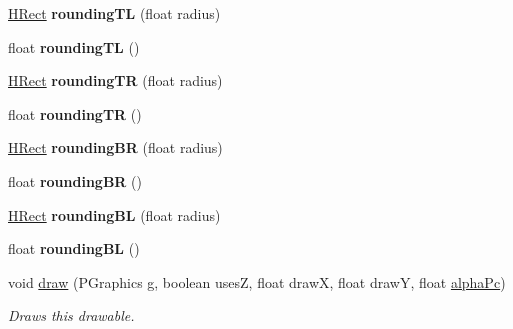 \begin{DoxyCompactItemize}
\item 
\hypertarget{classhype_1_1extended_1_1drawable_1_1_h_rect_a3dbebef6e54ba3c87be895d9e47fd8c4}{\hyperlink{classhype_1_1extended_1_1drawable_1_1_h_rect}{H\-Rect} {\bfseries rounding\-T\-L} (float radius)}\label{classhype_1_1extended_1_1drawable_1_1_h_rect_a3dbebef6e54ba3c87be895d9e47fd8c4}

\item 
\hypertarget{classhype_1_1extended_1_1drawable_1_1_h_rect_ac949ee8c38d5f35d3f440ea000406632}{float {\bfseries rounding\-T\-L} ()}\label{classhype_1_1extended_1_1drawable_1_1_h_rect_ac949ee8c38d5f35d3f440ea000406632}

\item 
\hypertarget{classhype_1_1extended_1_1drawable_1_1_h_rect_aee3e7b8de8f70b3476ec0257312e8e35}{\hyperlink{classhype_1_1extended_1_1drawable_1_1_h_rect}{H\-Rect} {\bfseries rounding\-T\-R} (float radius)}\label{classhype_1_1extended_1_1drawable_1_1_h_rect_aee3e7b8de8f70b3476ec0257312e8e35}

\item 
\hypertarget{classhype_1_1extended_1_1drawable_1_1_h_rect_a4512a97bf07ae5d008c00274dea1a8b0}{float {\bfseries rounding\-T\-R} ()}\label{classhype_1_1extended_1_1drawable_1_1_h_rect_a4512a97bf07ae5d008c00274dea1a8b0}

\item 
\hypertarget{classhype_1_1extended_1_1drawable_1_1_h_rect_a403cf9af3529a2251f9ac9316a668bab}{\hyperlink{classhype_1_1extended_1_1drawable_1_1_h_rect}{H\-Rect} {\bfseries rounding\-B\-R} (float radius)}\label{classhype_1_1extended_1_1drawable_1_1_h_rect_a403cf9af3529a2251f9ac9316a668bab}

\item 
\hypertarget{classhype_1_1extended_1_1drawable_1_1_h_rect_a37d0e960c8120b72a489c10659671a3b}{float {\bfseries rounding\-B\-R} ()}\label{classhype_1_1extended_1_1drawable_1_1_h_rect_a37d0e960c8120b72a489c10659671a3b}

\item 
\hypertarget{classhype_1_1extended_1_1drawable_1_1_h_rect_ad66438698f1bd3a33b214f3041c979b3}{\hyperlink{classhype_1_1extended_1_1drawable_1_1_h_rect}{H\-Rect} {\bfseries rounding\-B\-L} (float radius)}\label{classhype_1_1extended_1_1drawable_1_1_h_rect_ad66438698f1bd3a33b214f3041c979b3}

\item 
\hypertarget{classhype_1_1extended_1_1drawable_1_1_h_rect_acfddc39e1df383904a9c15317dae6d07}{float {\bfseries rounding\-B\-L} ()}\label{classhype_1_1extended_1_1drawable_1_1_h_rect_acfddc39e1df383904a9c15317dae6d07}

\item 
void \hyperlink{classhype_1_1extended_1_1drawable_1_1_h_rect_ac616395ca715c8fb6dddf74b203df51d}{draw} (P\-Graphics g, boolean uses\-Z, float draw\-X, float draw\-Y, float \hyperlink{classhype_1_1core_1_1drawable_1_1_h_drawable_ad4f0e4c9f93d810c66b39f1715625719}{alpha\-Pc})
\begin{DoxyCompactList}\small\item\em Draws this drawable. \end{DoxyCompactList}\end{DoxyCompactItemize}
